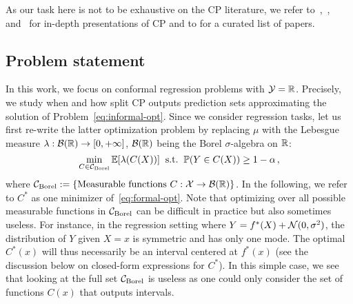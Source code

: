 As our task here is not to be exhaustive on the CP literature, we refer to~\citet{vovk2005algorithmic},~\citet{angelopoulos2023conformal}, and~\citet{fontana2023conformal} for in-depth presentations of CP and 
to \citet{manokhin_2022_6467205} for a curated list of papers.


\subsection{Problem statement}
\label{sec:problem-statement}

In this work, we focus on conformal regression problems with ${\cal Y}={\mathbb{R}}$. Precisely, we study when and how split CP outputs prediction sets approximating the solution of Problem~\eqref{eq:informal-opt}. Since we consider regression tasks, let us first re-write the latter optimization problem by replacing $\mu$ with the Lebesgue measure $\lambda:{\cal B}({\mathbb{R}})\rightarrow [0,+\infty]$, ${\cal B}({\mathbb{R}})$ being the Borel $\sigma$-algebra on ${\mathbb{R}}$:
\begin{equation}
    \label{eq:formal-opt}
    \min_{C \in {\cal C}_{\text{Borel}}} {\mathbb{E}}[\lambda(C (X))]  \hspace{0.2cm}\text{s.t.}\hspace{0.2cm}  {\mathbb{P}}(Y\in C(X)) \geq 1-\alpha\hspace{0.05cm},
\end{equation}
where ${\cal C}_{\text{Borel}}:=\{\text{Measurable functions } C:{\cal X}\rightarrow {\cal B}({\mathbb{R}})\}$. In the following, we refer to $C^*$ as one minimizer of~\eqref{eq:formal-opt}.
%
Note that optimizing over all possible measurable functions in ${\cal C}_\text{Borel}$ can be difficult in practice but also sometimes useless. For instance, in the regression setting where $Y=f^*(X) + {\cal N}(0, \sigma^2)$, the distribution of $Y$ given $X=x$ is symmetric and has only one mode. The optimal $C^*(x)$ will thus necessarily be an interval centered at $f^*(x)$ (see the discussion below on closed-form expressions for $C^*$). In this simple case, we see that looking at the full set ${\cal C}_{\text{Borel}}$ is useless as one could only consider the set of functions $C(x)$ that outputs intervals.  

